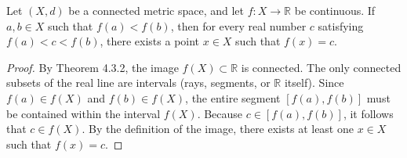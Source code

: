 \begin{theorem}
Let $(X, d)$ be a connected metric space, and let $f: X \to \mathbb{R}$ be continuous. If $a, b \in X$ such that $f(a) < f(b)$, then for every real number $c$ satisfying $f(a) < c < f(b)$, there exists a point $x \in X$ such that $f(x) = c$.
\end{theorem}

\begin{proof}
By Theorem 4.3.2, the image $f(X) \subset \mathbb{R}$ is connected. The only connected subsets of the real line are intervals (rays, segments, or $\mathbb{R}$ itself). Since $f(a) \in f(X)$ and $f(b) \in f(X)$, the entire segment $[f(a), f(b)]$ must be contained within the interval $f(X)$. Because $c \in [f(a), f(b)]$, it follows that $c \in f(X)$. By the definition of the image, there exists at least one $x \in X$ such that $f(x) = c$.
\end{proof}